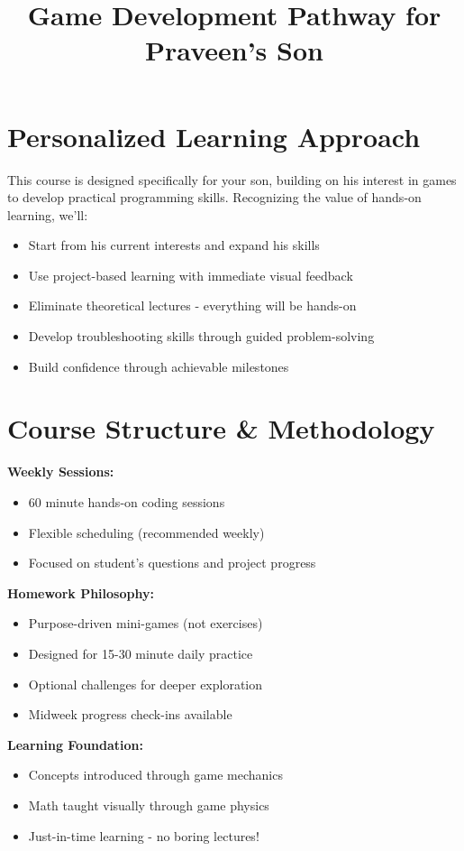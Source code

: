 \documentclass{article}
\title{\vspace{-3em}Game Development Pathway for Praveen's Son\vspace{-3em}}
\author{}
\begin{document}
\fontsize{14}{16}\selectfont
\maketitle

\section{Personalized Learning Approach}
This course is designed specifically for your son, building on his interest in games to develop practical programming skills. Recognizing the value of hands-on learning, we'll:

\begin{itemize}[leftmargin=*, noitemsep]
    \item Start from his current interests and expand his skills
    \item Use project-based learning with immediate visual feedback
    \item Eliminate theoretical lectures - everything will be hands-on
    \item Develop troubleshooting skills through guided problem-solving
    \item Build confidence through achievable milestones
\end{itemize}

\section{Course Structure \& Methodology}
\begin{learningblock}
\textbf{Weekly Sessions:} 
\begin{itemize}[noitemsep]
\item 60 minute hands-on coding sessions 
\item Flexible scheduling (recommended weekly)
\item Focused on student's questions and project progress
\end{itemize}

\textbf{Homework Philosophy:}
\begin{itemize}[noitemsep]
\item Purpose-driven mini-games (not exercises)
\item Designed for 15-30 minute daily practice
\item Optional challenges for deeper exploration
\item Midweek progress check-ins available
\end{itemize}

\textbf{Learning Foundation:}
\begin{itemize}[noitemsep]
\item Concepts introduced through game mechanics
\item Math taught visually through game physics
\item Just-in-time learning - no boring lectures!
\end{itemize}
\end{learningblock}
\end{document}
